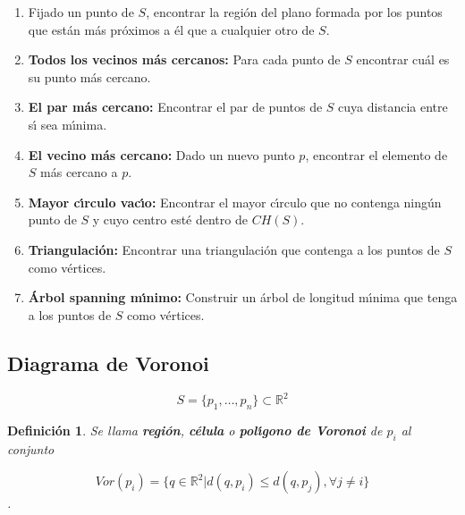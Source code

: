 \documentclass[ebook,oneside]{memoir}
\newtheorem{defn}[thm]{Definición}
\begin{document}
\begin{enumerate}

  \item Fijado un punto de $S$, encontrar la regi\'{o}n del plano
formada por los puntos que est\'{a}n m\'{a}s pr\'{o}ximos a \'{e}l que a cualquier
otro de $S$.

  \item \textbf{Todos los vecinos m\'{a}s cercanos:} Para cada punto de $S$ encontrar cu\'{a}l es su punto m\'{a}s cercano.

  \item \textbf{El par m\'{a}s cercano:} Encontrar el par de puntos de $S$ cuya distancia entre s\'{\i} sea m\'{\i}nima.

  \item \textbf{El vecino m\'{a}s cercano:} Dado un nuevo punto $p$,
encontrar el elemento de $S$ m\'{a}s cercano a $p$.

  \item \textbf{Mayor c\'{\i}rculo vac\'{\i}o:} Encontrar el mayor c\'{\i}rculo que no contenga ning\'{u}n punto de $S$ y cuyo centro est\'{e} dentro de $CH(S)$.

  \item \textbf{Triangulaci\'{o}n:} Encontrar una triangulaci\'{o}n que contenga a los puntos de $S$ como v\'{e}rtices.

  \item \textbf{\'{A}rbol spanning m\'{\i}nimo:} Construir un \'{a}rbol de longitud m\'{\i}nima que tenga a los puntos de $S$ como v\'{e}rtices.

\end{enumerate}

\subsection{Diagrama de Voronoi}

$$S = \{ p_1, \dots ,p_n \} \subset \mathbb{R}^2$$

\begin{defn}Se llama \textbf{regi\'{o}n}, \textbf{c\'{e}lula} o \textbf{pol\'{\i}gono de Voronoi} de  $p_i$ al conjunto

\vspace{-0.2cm}

$$Vor(p_i)=\{q\in \mathbb{R}^2 | d(q,p_i) \leq d(q,p_j), \forall j \neq i \}$$.

\end{defn}

\vspace{-0.1cm}
\end{document}
